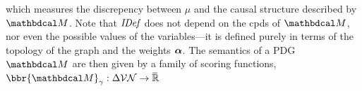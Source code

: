 \documentclass[twoside]{article}
\begin{document}
which
measures the discrepency between $\mu$ and the causal structure described
by $\dg M$. 
Note that $\mathit{IDef}_{\!}$ does not depend on the cpds
of $\dg M$, nor even the possible values of the
variables---it is defined purely in terms of the topology of the graph
and the weights $\boldsymbol\alpha$.  
The semantics of a PDG $\dg M$ are then given by a family of scoring
functions, 
$\bbr{\dg M}_\gamma: \Delta \V\N \to \Rext$
\end{document}
